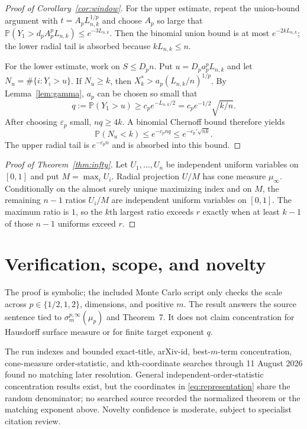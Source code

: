 \documentclass[11pt]{article}
\newcommand{\Pp}{\mathbb P}
\begin{document}
\begin{proof}[Proof of Corollary~\ref{cor:window}]
For the upper estimate, repeat the union-bound argument with
$t=A_pL_{n,k}^{1/p}$ and choose $A_p$ so large that
$\Pp(Y_1>d_pA_p^pL_{n,k})\leq e^{-3L_{n,k}}$.  Then the binomial union bound
is at most $e^{-2kL_{n,k}}$; the lower radial tail is absorbed because
$kL_{n,k}\leq n$.

For the lower estimate, work on $S\leq D_pn$.  Put
$u=D_pa_p^pL_{n,k}$ and let $N_u=\#\{i:Y_i>u\}$.  If $N_u\geq k$, then
$X_k^*>a_p(L_{n,k}/n)^{1/p}$.  By Lemma~\ref{lem:gamma}, $a_p$ can be chosen
so small that
\[
 q:=\Pp(Y_1>u)\geq c_p e^{-L_{n,k}/2}
 =c_p e^{-1/2}\sqrt{k/n}.
\]
After choosing $\varepsilon_p$ small, $nq\geq4k$.  A binomial Chernoff bound
therefore yields
\[
 \Pp(N_u<k)\leq e^{-c_pnq}\leq e^{-c_p'\sqrt{nk}}.
\]
The upper radial tail is $e^{-c_pn}$ and is absorbed into this bound.
\end{proof}

\begin{proof}[Proof of Theorem~\ref{thm:infty}]
Let $U_1,\ldots,U_n$ be independent uniform variables on $[0,1]$ and put
$M=\max_iU_i$.  Radial projection $U/M$ has cone measure $\mu_\infty$.
Conditionally on the almost surely unique maximizing index and on $M$, the
remaining $n-1$ ratios $U_i/M$ are independent uniform variables on $[0,1]$.
The maximum ratio is $1$, so the $k$th largest ratio exceeds $r$ exactly when
at least $k-1$ of those $n-1$ uniforms exceed $r$.
\end{proof}

\section*{Verification, scope, and novelty}

The proof is symbolic; the included Monte Carlo script only checks the scale
across $p\in\{1/2,1,2\}$, dimensions, and positive $m$.  The result answers
the source sentence tied to $\sigma_m^{p,\infty}(\mu_p)$ and Theorem~7.  It
does not claim concentration for Hausdorff surface measure or for finite
target exponent $q$.

The run indexes and bounded exact-title, arXiv-id, best-$m$-term
concentration, cone-measure order-statistic, and kth-coordinate searches
through 11 August 2026 found no matching later resolution.  General
independent-order-statistic concentration results exist, but the coordinates
in \eqref{eq:representation} share the random denominator; no searched source
recorded the normalized theorem or the matching exponent above.  Novelty
confidence is moderate, subject to specialist citation review.
\end{document}

